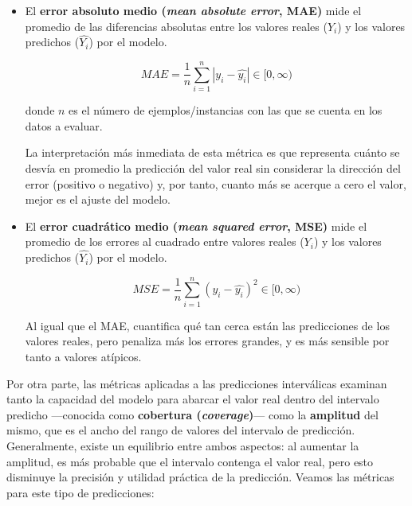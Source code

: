 \begin{itemize}
    \item El \textbf{error absoluto medio (\textit{mean absolute error}, MAE)} mide el promedio de las 
    diferencias absolutas entre los valores reales ($Y_i$) y los valores predichos ($\hat{Y_i}$) por el 
    modelo.

    $$
    MAE = \frac{1}{n} \sum_{i=1}^n{|y_i - \hat{y_i}|} \in [0, \infty)
    $$

    donde $n$ es el número de ejemplos/instancias con las que se cuenta en los datos a evaluar.

    La interpretación más inmediata de esta métrica es que representa cuánto se desvía en promedio la 
    predicción del valor real sin considerar la dirección del error (positivo o negativo) y, por tanto, cuanto 
    más se acerque a cero el valor, mejor es el ajuste del modelo.

    \item El \textbf{error cuadrático medio (\textit{mean squared error}, MSE)} mide el promedio de los 
    errores al cuadrado entre valores reales ($Y_i$) y los valores predichos ($\hat{Y_i}$) por el modelo.
    
    $$
    MSE = \frac{1}{n} \sum_{i=1}^n{(y_i - \hat{y_i})^2} \in [0, \infty)
    $$

    Al igual que el MAE, cuantifica qué tan cerca están las predicciones de los valores reales, pero penaliza
    más los errores grandes, y es más sensible por tanto a valores atípicos.

\end{itemize}


Por otra parte, las métricas aplicadas a las predicciones interválicas examinan tanto la capacidad del modelo 
para abarcar el valor real dentro del intervalo predicho ---conocida como 
\textbf{cobertura (\textit{coverage})}--- como la \textbf{amplitud} del mismo, que es el ancho del rango de valores 
del intervalo de predicción. 
Generalmente, existe un equilibrio entre ambos aspectos: al aumentar la amplitud, es más probable que el 
intervalo contenga el valor real, pero esto disminuye la precisión y utilidad práctica de la predicción.
Veamos las métricas para este tipo de predicciones: 

